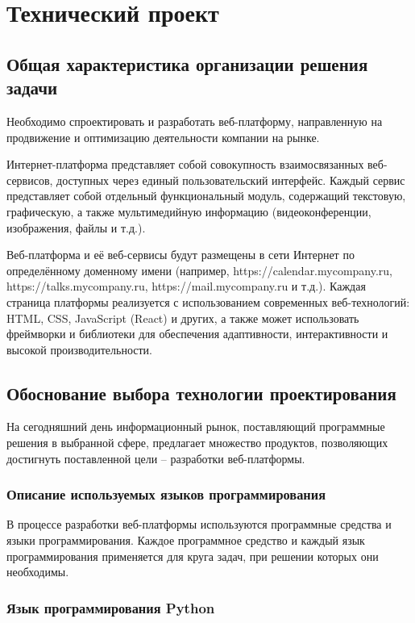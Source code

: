 \section{Технический проект}
\subsection{Общая характеристика организации решения задачи}

Необходимо спроектировать и разработать веб-платформу, направленную на продвижение и оптимизацию деятельности компании на рынке.

Интернет-платформа представляет собой совокупность взаимосвязанных веб-сервисов, доступных через единый пользовательский интерфейс. Каждый сервис представляет собой отдельный функциональный модуль, содержащий текстовую, графическую, а также мультимедийную информацию (видеоконференции, изображения, файлы и т.д.).

Веб-платформа и её веб-сервисы будут размещены в сети Интернет по определённому доменному имени (например, https://calendar.mycompany.ru, https://talks.mycompany.ru, https://mail.mycompany.ru и т.д.). Каждая страница платформы реализуется с использованием современных веб-технологий: HTML, CSS, JavaScript (React) и других, а также может использовать фреймворки и библиотеки для обеспечения адаптивности, интерактивности и высокой производительности.

\subsection{Обоснование выбора технологии проектирования}

На сегодняшний день информационный рынок, поставляющий программные решения в выбранной сфере, предлагает множество продуктов, позволяющих достигнуть поставленной цели – разработки веб-платформы.

\subsubsection{Описание используемых языков программирования}

В процессе разработки веб-платформы используются программные средства и языки программирования. Каждое программное средство и каждый язык программирования применяется для круга задач, при решении которых они необходимы.

\subsubsection{Язык программирования Python}

